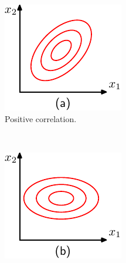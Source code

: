 \begin{figure}
	\centering
	\begin{subfigure}[b]{0.3\textwidth}
		\includegraphics[width=\textwidth]{./lecture6/Figure28a.pdf}
		\caption{Positive correlation.}
	\end{subfigure}
	~
	\begin{subfigure}[b]{0.3\textwidth}
		\includegraphics[width=\textwidth]{./lecture6/Figure28b.pdf}

\end{subfigure}
\end{figure}

